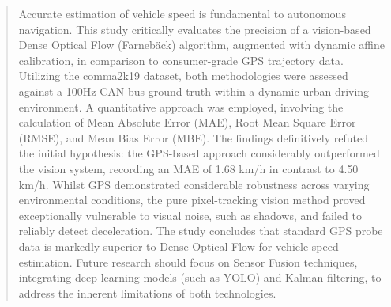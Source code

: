 \begin{abstract}
Accurate estimation of vehicle speed is fundamental to autonomous navigation. This study critically evaluates the precision of a vision-based Dense Optical Flow (Farnebäck) algorithm, augmented with dynamic affine calibration, in comparison to consumer-grade GPS trajectory data. Utilizing the comma2k19 dataset, both methodologies were assessed against a 100Hz CAN-bus ground truth within a dynamic urban driving environment. A quantitative approach was employed, involving the calculation of Mean Absolute Error (MAE), Root Mean Square Error (RMSE), and Mean Bias Error (MBE). The findings definitively refuted the initial hypothesis: the GPS-based approach considerably outperformed the vision system, recording an MAE of 1.68 km/h in contrast to 4.50 km/h. Whilst GPS demonstrated considerable robustness across varying environmental conditions, the pure pixel-tracking vision method proved exceptionally vulnerable to visual noise, such as shadows, and failed to reliably detect deceleration. The study concludes that standard GPS probe data is markedly superior to Dense Optical Flow for vehicle speed estimation. Future research should focus on Sensor Fusion techniques, integrating deep learning models (such as YOLO) and Kalman filtering, to address the inherent limitations of both technologies.
\end{abstract}